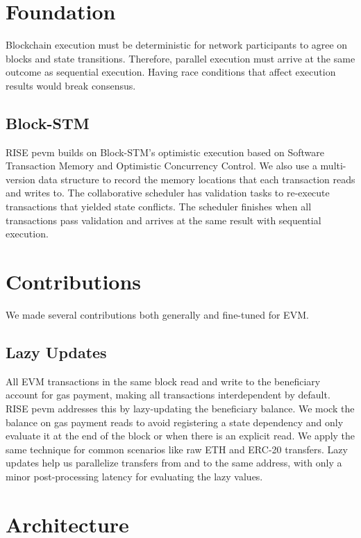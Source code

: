 \documentclass{article}
\begin{document}
\section{Foundation}

Blockchain execution must be deterministic for network participants to agree on blocks and state transitions.
Therefore, parallel execution must arrive at the same outcome as sequential execution. Having race conditions that
affect execution results would break consensus.

\subsection{Block-STM}

RISE pevm builds on Block-STM's optimistic execution based on Software Transaction Memory\cite{stm} and Optimistic
Concurrency Control\cite{occ}. We also use a multi-version data structure to record the memory locations that each
transaction reads and writes to. The collaborative scheduler has validation tasks to re-execute transactions that
yielded state conflicts. The scheduler finishes when all transactions pass validation and arrives at the same result
with sequential execution.

\section{Contributions}

We made several contributions both generally and fine-tuned for EVM.

\subsection{Lazy Updates}

All EVM transactions in the same block read and write to the beneficiary account for gas payment, making all
transactions interdependent by default. RISE pevm addresses this by lazy-updating the beneficiary balance. We mock the
balance on gas payment reads to avoid registering a state dependency and only evaluate it at the end of the block or
when there is an explicit read. We apply the same technique for common scenarios like raw ETH and ERC-20 transfers.
Lazy updates help us parallelize transfers from and to the same address, with only a minor post-processing latency for
evaluating the lazy values.

\section{Architecture}
\end{document}
